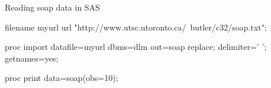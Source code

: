 \documentclass[unknownkeysallowed]{beamer}\usepackage[]{graphicx}\usepackage[]{color}
\begin{document}

\begin{frame}[fragile]{Reading soap data in SAS}
  
  \begin{Sascode}[store=ub]
filename myurl 
 url 
 "http://www.utsc.utoronto.ca/~butler/c32/soap.txt";

proc import 
  datafile=myurl 
  dbms=dlm
  out=soap
  replace;
  delimiter=' ';
  getnames=yes;
  
proc print data=soap(obs=10);

  \end{Sascode}
  
\end{frame}
\end{document}
